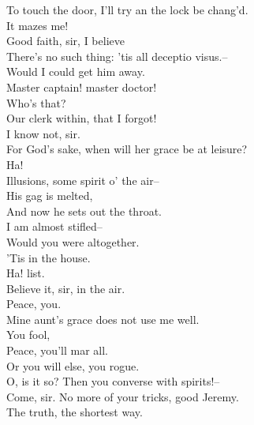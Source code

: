 \documentclass{memoir}
\begin{document}
\begin{drama*}
 To touch the door, I'll try an the lock be chang'd.\\
\lovewitspeaks  It mazes me!\\
\facespeaks {} Good faith, sir, I believe\\
 There's no such thing: 'tis all deceptio visus.--\\
 Would I could get him away.\\
\dapperspeaks {} Master captain! master doctor!\\
\lovewitspeaks {} Who's that?\\
\facespeaks {} Our clerk within, that I forgot!\\
 I know not, sir.\\
\dapperspeaks {} For God's sake, when will her grace be at leisure?\\
\facespeaks {} Ha!\\
 Illusions, some spirit o' the air--\\
 His gag is melted,\\
 And now he sets out the throat.\\
\dapperspeaks {} I am almost stifled--\\
\facespeaks {} Would you were altogether.\\
\lovewitspeaks {} 'Tis in the house.\\
 Ha! list.\\
\facespeaks {} Believe it, sir, in the air.\\
\lovewitspeaks {} Peace, you.\\
\dapperspeaks {} Mine aunt's grace does not use me well.\\
\subtlespeaks {} You fool,\\
 Peace, you'll mar all.\\
\facespeaks {}
 Or you will else, you rogue.\\
\lovewitspeaks {} O, is it so? Then you converse with spirits!--\\
 Come, sir. No more of your tricks, good Jeremy.\\
 The truth, the shortest way.\\

\end{drama*}
\end{document}
